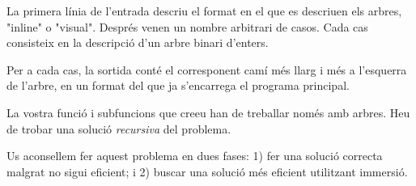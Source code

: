 \Input

La primera línia de l'entrada descriu el format en el que es descriuen els arbres, "inline" o "visual". Després venen un nombre arbitrari de casos. Cada cas consisteix en la descripció d'un arbre binari d'enters.

\Output

Per a cada cas, la sortida conté el corresponent camí més llarg i més a l'esquerra de l'arbre, en un format del que ja s'encarrega el programa principal.

\Observation

La vostra funció i subfuncions que creeu han de treballar només amb arbres. Heu de trobar una solució \emph{recursiva} del problema.

\medskip

Us aconsellem fer aquest problema en dues fases: 1) fer una solució correcta malgrat no sigui eficient; i 2) buscar una solució més eficient utilitzant immersió.

\SampleTwoCol
